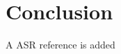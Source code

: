 \chapter*{Conclusion}
\lipsum
A \gls{ASR} reference is added \textcite{birkinshawConfigurationsStrategyStructure1995, benyoucefArtificialIntelligenceTechniques2010}\\